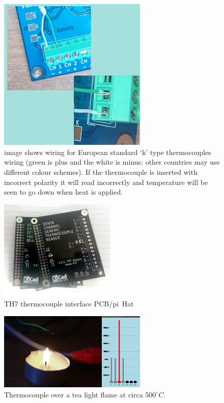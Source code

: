 \documentclass[10pt,foldmark]{leaflet}
\begin{document}
\begin{figure}[h]
 \centering
 \includegraphics[width=200pt]{./wiring.jpg}
 \caption{image shows wiring for European standard `k' type thermocouples wiring (green is plus and the white is minus; other countries may use different colour schemes). 
%
 If the thermocouple is inserted with incorrect polarity it will read incorrectly and temperature will be seen to go down when heat is applied.}
 \label{fig:con}
\end{figure}

\begin{figure}[h]
 \centering
 \includegraphics[width=156pt]{./TH7_0p3.jpg}
 \caption{TH7 thermocouple interface PCB/pi~Hat}
 \label{fig:th7_2}
\end{figure}

\clearpage
\begin{figure}[ht]
 \centering
 \includegraphics[width=200pt]{TH7_tea_light.jpg}
 \caption{Thermocouple over a tea light flame at circa ${500}^{\circ} C$.}
 \label{fig:pi}
\end{figure}
\mbox{}
\vfill
\end{document}

